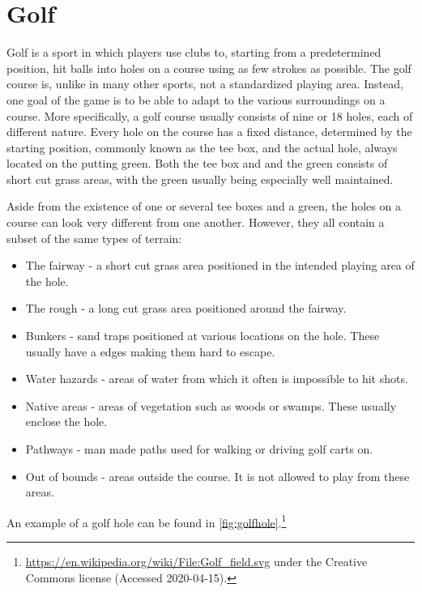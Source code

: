 \documentclass{kththesis}
\begin{document}
\section{Golf}
\label{sec:golf}
Golf is a sport in which players use clubs to, starting from a predetermined position, hit balls into holes on a course using as few strokes as possible. The golf course is, unlike in many other sports, not a standardized playing area. Instead, one goal of the game is to be able to adapt to the various surroundings on a course. More specifically, a golf course usually consists of nine or 18 holes, each of different nature. Every hole on the course has a fixed distance, determined by the starting position, commonly known as the tee box, and the actual hole, always located on the putting green. Both the tee box and and the green consists of short cut grass areas, with the green usually being especially well maintained.

Aside from the existence of one or several tee boxes and a green, the holes on a course can look very different from one another. However, they all contain a subset of the same types of terrain:
\begin{itemize}
    \item The fairway - a short cut grass area positioned in the intended playing area of the hole. 
    \item The rough - a long cut grass area positioned around the fairway.
    \item Bunkers - sand traps positioned at various locations on the hole. These usually have a edges making them hard to escape.
    \item Water hazards - areas of water from which it often is impossible to hit shots.
    \item Native areas - areas of vegetation such as woods or swamps. These usually enclose the hole.
    \item Pathways - man made paths used for walking or driving golf carts on.
    \item Out of bounds - areas outside the course. It is not allowed to play from these areas.
\end{itemize}
An example of a golf hole can be found in \autoref{fig:golfhole}.\footnote{\url{https://en.wikipedia.org/wiki/File:Golf_field.svg} under the Creative Commons license (Accessed 2020-04-15).}
\end{document}
